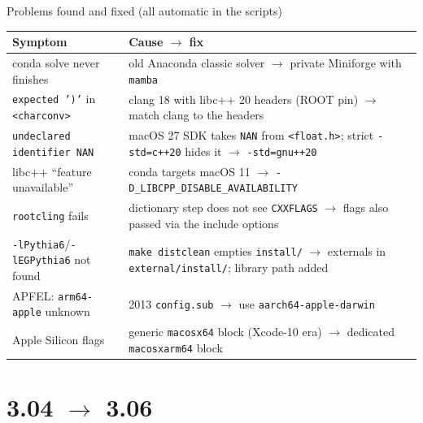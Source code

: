\documentclass[10pt,aspectratio=169]{beamer}
\newcommand{\code}[1]{\texttt{\small #1}}
\begin{document}
\begin{frame}{Problems found and fixed (all automatic in the scripts)}
  \footnotesize
  \begin{tabular}{@{}L{0.31\textwidth}L{0.64\textwidth}@{}}
    \toprule
    Symptom & Cause $\rightarrow$ fix \\
    \midrule
    conda solve never finishes & old Anaconda classic solver $\rightarrow$ private Miniforge with \code{mamba} \\
    \code{expected ')'} in \code{<charconv>} & clang 18 with libc++ 20 headers (ROOT pin) $\rightarrow$ match clang to the headers \\
    \code{undeclared identifier NAN} & macOS 27 SDK takes \code{NAN} from \code{<float.h>}; strict \code{-std=c++20} hides it $\rightarrow$ \code{-std=gnu++20} \\
    libc++ ``feature unavailable'' & conda targets macOS 11 $\rightarrow$ \code{-D\_LIBCPP\_DISABLE\_AVAILABILITY} \\
    \code{rootcling} fails & dictionary step does not see \code{CXXFLAGS} $\rightarrow$ flags also passed via the include options \\
    \code{-lPythia6}/\code{-lEGPythia6} not found & \code{make distclean} empties \code{install/} $\rightarrow$ externals in \code{external/install/}; library path added \\
    APFEL: \code{arm64-apple} unknown & 2013 \code{config.sub} $\rightarrow$ use \code{aarch64-apple-darwin} \\
    Apple Silicon flags & generic \code{macosx64} block (Xcode-10 era) $\rightarrow$ dedicated \code{macosxarm64} block \\
    \bottomrule
  \end{tabular}
\end{frame}

\section{3.04 $\rightarrow$ 3.06}
\end{document}
